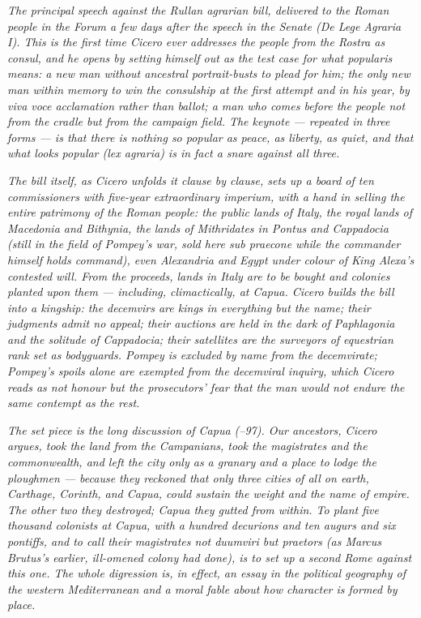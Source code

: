 
\textit{The principal speech against the Rullan agrarian
bill, delivered to the Roman people in the Forum a few days
after the speech in the Senate (\textit{De Lege Agraria I}).
This is the first time Cicero ever addresses the people from
the Rostra as consul, and he opens by setting himself out as
the test case for what \textit{popularis} means: a new man
without ancestral portrait-busts to plead for him; the only
new man within memory to win the consulship at the first
attempt and in his year, by viva voce acclamation rather than
ballot; a man who comes before the people not from the cradle
but from the campaign field. The keynote --- repeated in three
forms --- is that there is nothing so popular as peace, as
liberty, as quiet, and that what looks popular (\textit{lex
agraria}) is in fact a snare against all three.}

\textit{The bill itself, as Cicero unfolds it clause by
clause, sets up a board of ten commissioners with five-year
extraordinary imperium, with a hand in selling the entire
patrimony of the Roman people: the public lands of Italy, the
royal lands of Macedonia and Bithynia, the lands of Mithridates
in Pontus and Cappadocia (still in the field of Pompey's war,
sold here \textit{sub praecone} while the commander himself
holds command), even Alexandria and Egypt under colour of
King Alexa's contested will. From the proceeds, lands in
Italy are to be bought and colonies planted upon them ---
including, climactically, at Capua. Cicero builds the bill
into a kingship: the decemvirs are kings in everything but
the name; their judgments admit no appeal; their auctions are
held in the dark of Paphlagonia and the solitude of
Cappadocia; their satellites are the surveyors of equestrian
rank set as bodyguards. Pompey is excluded by name from the
decemvirate; Pompey's spoils alone are exempted from the
decemviral inquiry, which Cicero reads as not honour but the
prosecutors' fear that the man would not endure the same
contempt as the rest.}

\textit{The set piece is the long discussion of Capua
(--97). Our ancestors, Cicero argues, took the
land from the Campanians, took the magistrates and the
commonwealth, and left the city only as a granary and a place
to lodge the ploughmen --- because they reckoned that only
three cities of all on earth, Carthage, Corinth, and Capua,
could sustain the weight and the name of empire. The other two
they destroyed; Capua they gutted from within. To plant five
thousand colonists at Capua, with a hundred decurions and ten
augurs and six pontiffs, and to call their magistrates not
duumviri but \textit{praetors} (as Marcus Brutus's earlier,
ill-omened colony had done), is to set up a second Rome
against this one. The whole digression is, in effect, an essay
in the political geography of the western Mediterranean and a
moral fable about how character is formed by place.}

